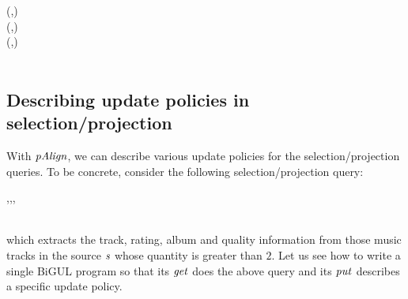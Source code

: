 {\begin{hscode}
\>[23]{}\mid {}\;\mathrel{\wedge}\;\equiv {}\mathrel{=}(,){}\<[E]%
\\
\>[23]{}\mid {}\mathrel{=}{}\<[38]%
\>[38]{}\;(,)\mathrel{=}\;\;\<[E]%
\\
\>[38]{}\;{}\<[42]%
\>[42]{}(,\mathbin{:}){}\<[E]%
\\
\>[3]{}\<[5]%
\>[5]{}\;\;\<[22]%
\>[22]{}\mid {}\;\mathrel{=}\<[E]%
\\
\>[22]{}\mid {}\mathrel{=}\;\<[E]%
\ColumnHook
\end{hscode}\resethooks
}

\subsection{Describing update policies in selection/projection}
\label{sec:policy}

With \ensuremath{\Varid{pAlign}}, we can describe various update policies
for the selection/projection queries. To be concrete,
consider the following selection/projection query:\begin{hscode}\SaveRestoreHook
{}%
%
%
\>[3]{}\;,,,\;\;\<[E]%
\\
\>[3]{}\;\<[E]%
\\
\>[3]{}\;\mathbin{>}\<[E]%
\ColumnHook
\end{hscode}\resethooks
which extracts the track, rating, album and quality information from
those music tracks in the source \ensuremath{\Varid{s}} whose quantity is greater than \ensuremath{\mathrm{2}}.
Let us see how to write a single BiGUL program so that its \ensuremath{\Varid{get}}
does the above query and its \ensuremath{\Varid{put}} describes a specific update policy.

